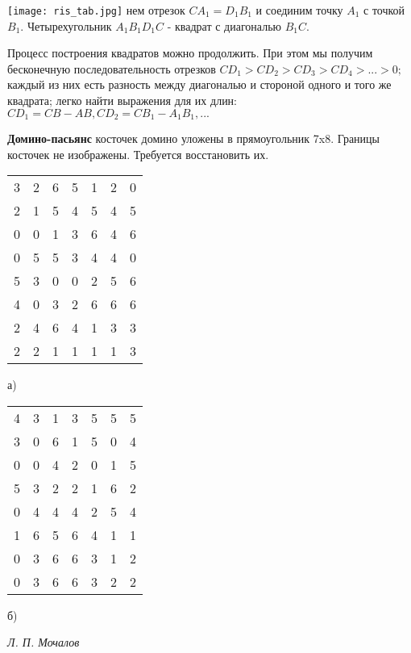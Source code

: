 \newpage
\setcounter{page}{62}
\begin{minipage}{0.55\textwidth}
\texttt{[image: ris\_tab.jpg]}\newline
нем отрезок $CA_1=D_1B_1$ и соединим точку $A_1$ с точкой $B_1$. Четырехугольник $A_1B_1D_1C$ - квадрат с диагональю $B_1C$.\par
Процесс построения квадратов можно продолжить. При этом мы получим бесконечную последовательность отрезков\newline
$ CD_1>CD_2>CD_3>CD_4>...>0;$
каждый из них есть разность между диагональю и стороной одного и того же квадрата; легко найти выражения для их длин:\newline
$CD_1=CB-AB,CD_2=CB_1-A_1B_1,...$
\end{minipage}
\hfill
\begin{minipage}{0.35\textwidth}
  \textbf{\Large Домино-пасьянс}\newline
   косточек домино уложены в прямоугольник 7x8. Границы косточек не изображены. Требуется восстановить их.\newline
  \newline
  \begin{tabular}{|c c c c c c c|}
  \hline
  3 & 2 & 6 & 5 & 1 & 2 & 0\\
  2 & 1 & 5 & 4 & 5 & 4 & 5\\
  0 & 0 & 1 & 3 & 6 & 4 & 6\\
  0 & 5 & 5 & 3 & 4 & 4 & 0\\
  5 & 3 & 0 & 0 & 2 & 5 & 6\\
  4 & 0 & 3 & 2 & 6 & 6 & 6\\
  2 & 4 & 6 & 4 & 1 & 3 & 3\\
  2 & 2 & 1 & 1 & 1 & 1 & 3\\
  \hline
  \end{tabular}\newline
  а) \newline
  \newline
  \begin{tabular}{|c c c c c c c|}
  \hline
  4 & 3 & 1 & 3 & 5 & 5 & 5\\
  3 & 0 & 6 & 1 & 5 & 0 & 4\\
  0 & 0 & 4 & 2 & 0 & 1 & 5\\
  5 & 3 & 2 & 2 & 1 & 6 & 2\\
  0 & 4 & 4 & 4 & 2 & 5 & 4\\
  1 & 6 & 5 & 6 & 4 & 1 & 1\\
  0 & 3 & 6 & 6 & 3 & 1 & 2\\
  0 & 3 & 6 & 6 & 3 & 2 & 2\\
  \hline
  \end{tabular}\newline
  б)
  \begin{flushright}
  \textit{Л. П. Мочалов}
\end{flushright}
\end{minipage}